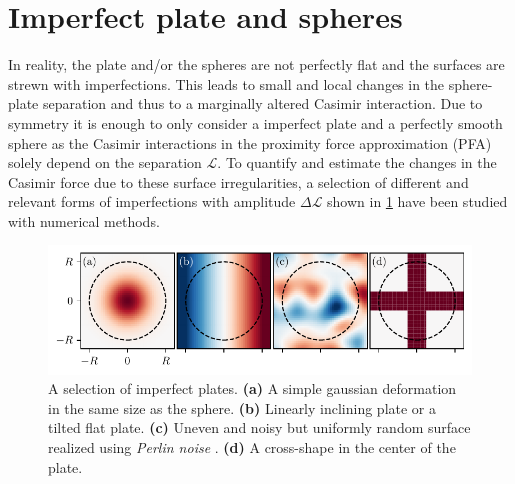 \section{Imperfect plate and spheres}
\label{sec:3:imperfect-plates}

In reality, the plate and/or the spheres are not perfectly flat and the surfaces are strewn with imperfections.
This leads to small and local changes in the sphere-plate separation and thus to a marginally altered Casimir interaction.
Due to symmetry it is enough to only consider a imperfect plate and a perfectly smooth sphere as the Casimir interactions in the proximity force approximation (PFA) solely depend on the separation $\mathscr{L}$.
To quantify and estimate the changes in the Casimir force due to these surface irregularities, a selection of different and relevant forms of imperfections with amplitude $\Delta \mathscr{L}$ shown in \cref{fig:3:imperfect-plates} have been studied with numerical methods.
\begin{figure}[!htbp]
  \centering
  \includegraphics[width=\textwidth]{../figures/casimir/imperfect-plates-advanced.pdf}
  \caption{A selection of imperfect plates. \textbf{(a)} A simple gaussian deformation in the same size as the sphere. \textbf{(b)} Linearly inclining plate or a tilted flat plate. \textbf{(c)} Uneven and noisy but uniformly random surface realized using \textit{Perlin noise} \cite{Perlin_1985}. \textbf{(d)} A cross-shape in the center of the plate.}
  \label{fig:3:imperfect-plates}
\end{figure}
